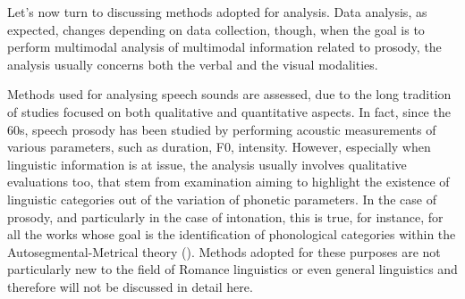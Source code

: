 \documentclass[output=paper]{langsci/langscibook}
\begin{document}
Let’s now turn to discussing methods adopted for analysis. Data analysis, as expected, changes depending on data collection, though, when the goal is to perform multimodal analysis of multimodal information related to prosody, the analysis usually concerns both the verbal and the visual modalities. 

Methods used for analysing speech sounds are assessed, due to the long tradition of studies focused on both qualitative and quantitative aspects. In fact, since the 60s, speech prosody has been studied by performing acoustic measurements of various parameters, such as duration, F0, intensity. However, especially when linguistic information is at issue, the analysis usually involves qualitative evaluations too, that stem from examination aiming to highlight the existence of linguistic categories out of the variation of phonetic parameters. In the case of prosody, and particularly in the case of intonation, this is true, for instance, for all the works whose goal is the identification of phonological categories within the Autosegmental-Metrical theory (\citealt{Pierrehumbert1980,Ladd.1996,Beckman1997}). Methods adopted for these purposes are not particularly new to the field of Romance linguistics or even general linguistics and therefore will not be discussed in detail here. 
\end{document}
